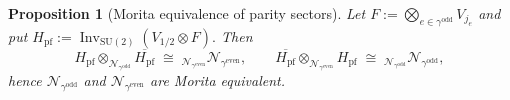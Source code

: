 \documentclass[11pt]{article}
\newtheorem{proposition}{Proposition}[section]
\begin{document}
\begin{proposition}[Morita equivalence of parity sectors]\label{prop:Morita}
Let
\(
   F:=\bigotimes_{e\in\gamma^{\mathrm{odd}}} V_{j_e}
\)
and put
\(
   H_{\mathrm{pf}}
   :=\operatorname{Inv}_{\mathrm{SU}(2)}(V_{1/2}\!\otimes\!F).
\)
Then
\[
  H_{\mathrm{pf}}\!\otimes_{\mathcal N_{\gamma^{\mathrm{odd}}}}
  \overline{H_{\mathrm{pf}}}
  \;\cong\;
  {}_{\mathcal N_{\gamma^{\mathrm{even}}}}\mathcal N_{\gamma^{\mathrm{even}}},
  \qquad
  \overline{H_{\mathrm{pf}}}\!\otimes_{\mathcal N_{\gamma^{\mathrm{even}}}}
  H_{\mathrm{pf}}
  \;\cong\;
  {}_{\mathcal N_{\gamma^{\mathrm{odd}}}}\mathcal N_{\gamma^{\mathrm{odd}}},
\]
hence $\mathcal N_{\gamma^{\mathrm{odd}}}$ and
$\mathcal N_{\gamma^{\mathrm{even}}}$ are Morita equivalent.
\end{proposition}
\end{document}
